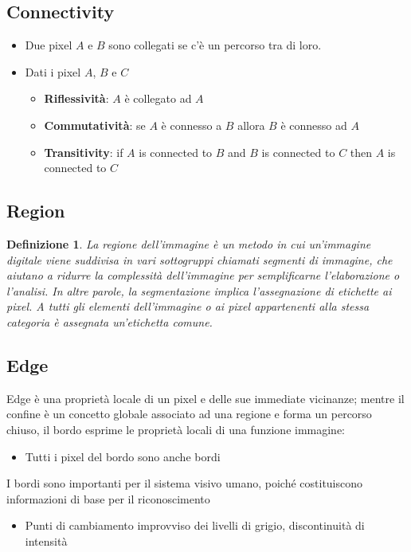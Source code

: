 \documentclass{report}
\newtheorem{defi}{Definizione}[section]
\begin{document}
\subsection{Connectivity}
\label{sec:conct}
\begin{itemize}
\item Due pixel $A$ e $B$ sono collegati se c'è un percorso tra di loro.
\item Dati i pixel $A$, $B$ e $C$
  \begin{itemize}
  \item \textbf{Riflessività}: $A$ è collegato ad $A$
  \item \textbf{Commutatività}: se $A$ è connesso a $B$ allora $B$ è
    connesso ad $A$
  \item \textbf{Transitivity}: if $A$ is connected to $B$ and $B$ is
    connected to $C$ then $A$ is connected to $C$
  \end{itemize}
\end{itemize}

\subsection{Region}
\label{sec:region}

\begin{defi}
  La regione dell'immagine è un metodo in cui un'immagine digitale viene
  suddivisa in vari sottogruppi chiamati segmenti di immagine, che
  aiutano a ridurre la complessità dell'immagine per semplificarne
  l'elaborazione o l'analisi. In altre parole, la segmentazione implica
  l'assegnazione di etichette ai pixel. A tutti gli elementi
  dell'immagine o ai pixel appartenenti alla stessa categoria è
  assegnata un'etichetta comune.
\end{defi}

\subsection{Edge}
\label{sec:edge}

Edge è una proprietà locale di un pixel e delle sue immediate vicinanze;
mentre il confine è un concetto globale associato ad una regione e
forma un percorso chiuso, il bordo esprime le proprietà locali di una
funzione immagine:
\begin{itemize}
\item Tutti i pixel del bordo sono anche bordi
\end{itemize}
I bordi sono importanti per il sistema visivo umano, poiché costituiscono informazioni di base per il riconoscimento
\begin{itemize}
\item Punti di cambiamento improvviso dei livelli di grigio, discontinuità di intensità
\end{itemize}
\end{document}
